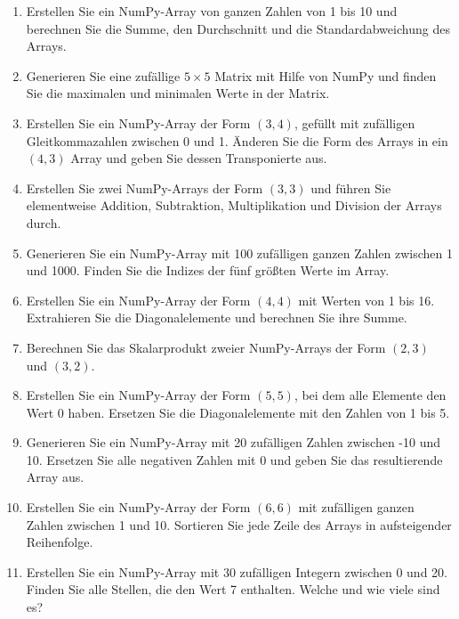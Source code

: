 \documentclass{ubo_tex_uebungszettel/uebungszettel}
\theoremstyle{definition}
\begin{document}
    \begin{enumerate}

            \item Erstellen Sie ein NumPy-Array von ganzen Zahlen von 1 bis 10 und berechnen Sie die Summe, den Durchschnitt und die Standardabweichung des Arrays.
            
            \item Generieren Sie eine zufällige $5 \times 5$ Matrix mit Hilfe von NumPy und finden Sie die maximalen und minimalen Werte in der Matrix.
            
            \item Erstellen Sie ein NumPy-Array der Form $(3, 4)$, gefüllt mit zufälligen Gleitkommazahlen zwischen 0 und 1. Änderen Sie die Form des Arrays in ein $(4, 3)$ Array und geben Sie dessen Transponierte aus.
            
            \item Erstellen Sie zwei NumPy-Arrays der Form $(3, 3)$ und führen Sie elementweise Addition, Subtraktion, Multiplikation und Division der Arrays durch.
            
            \item Generieren Sie ein NumPy-Array mit 100 zufälligen ganzen Zahlen zwischen 1 und 1000. Finden Sie die Indizes der fünf größten Werte im Array.
            
            \item Erstellen Sie ein NumPy-Array der Form $(4, 4)$ mit Werten von 1 bis 16. Extrahieren Sie die Diagonalelemente und berechnen Sie ihre Summe.
            
            \item Berechnen Sie das Skalarprodukt zweier NumPy-Arrays der Form $(2, 3)$ und $(3, 2)$.
            
            \item Erstellen Sie ein NumPy-Array der Form $(5, 5)$, bei dem alle Elemente den Wert 0 haben. Ersetzen Sie die Diagonalelemente mit den Zahlen von 1 bis 5.
            
            \item Generieren Sie ein NumPy-Array mit 20 zufälligen Zahlen zwischen -10 und 10. Ersetzen Sie alle negativen Zahlen mit 0 und geben Sie das resultierende Array aus.
            
            \item Erstellen Sie ein NumPy-Array der Form $(6, 6)$ mit zufälligen ganzen Zahlen zwischen 1 und 10. Sortieren Sie jede Zeile des Arrays in aufsteigender Reihenfolge.
            
            \item Erstellen Sie ein NumPy-Array mit 30 zufälligen Integern zwischen 0 und 20. Finden Sie alle Stellen, die den Wert 7 enthalten. Welche und wie viele sind es?
    \end{enumerate}
\end{document}
